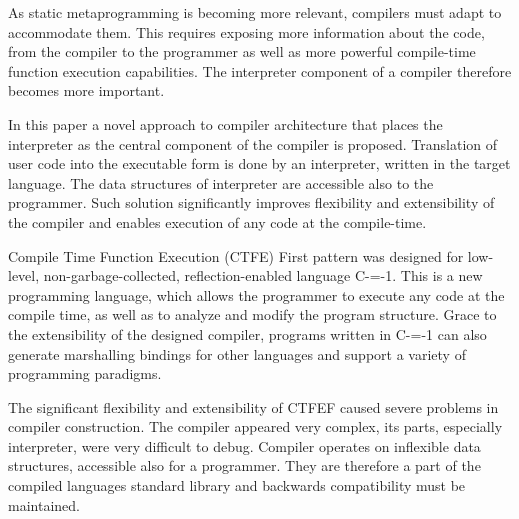 As static metaprogramming is becoming more relevant, compilers must adapt to accommodate them. This requires exposing more information about the code, from the compiler to the programmer as well as more powerful compile-time function execution capabilities. The interpreter component of a compiler therefore becomes more important.

In this paper a novel approach to compiler architecture that places the interpreter as the central component of the compiler is proposed.
Translation of user code into the executable form is done by an interpreter, written in the target language. The data structures of interpreter are accessible also to the programmer. Such solution significantly improves flexibility and extensibility of the compiler and enables execution of any code at the compile-time.

Compile Time Function Execution (CTFE) First pattern was designed for low-level, non-garbage-collected, reflection-enabled language C-=-1. This is a new programming language, which allows the programmer to execute any code at the compile time, as well as to analyze and modify the program structure. Grace to the extensibility of the designed compiler, programs written in C-=-1 can also generate marshalling bindings for other languages and support a variety of programming paradigms.

The significant flexibility and extensibility of CTFEF caused severe problems in compiler construction. The compiler appeared very complex, its parts, especially interpreter, were very difficult to debug. Compiler operates on inflexible data structures, accessible also for a programmer. They are therefore a part of the compiled languages standard library and backwards compatibility must be maintained.
